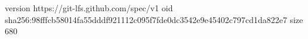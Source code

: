 version https://git-lfs.github.com/spec/v1
oid sha256:98fffcb58014fa55dddf921112c095f7fde0dc3542e9e45402c797cd1da822e7
size 680

